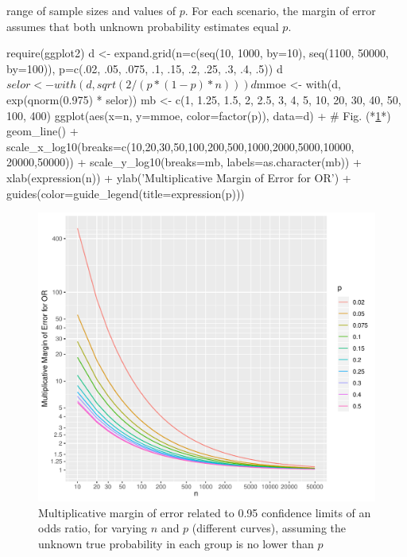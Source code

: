   range of sample sizes and values of $p$.  For each scenario, the
  margin of error assumes that both unknown probability estimates equal $p$.
\ei
\begin{Schunk}
\begin{Sinput}
require(ggplot2)
d <- expand.grid(n=c(seq(10, 1000, by=10), seq(1100, 50000, by=100)),
                 p=c(.02, .05, .075, .1, .15, .2, .25, .3, .4, .5))
d$selor <- with(d, sqrt(2 / (p * (1 - p) * n)))
d$mmoe  <- with(d, exp(qnorm(0.975) * selor))
mb <- c(1, 1.25, 1.5, 2, 2.5, 3, 4, 5, 10, 20, 30, 40, 50, 100, 400)
ggplot(aes(x=n, y=mmoe, color=factor(p)), data=d) +   # Fig. (*\ref{fig:prop-mmeor}*)
  geom_line() +
  scale_x_log10(breaks=c(10,20,30,50,100,200,500,1000,2000,5000,10000,
                  20000,50000)) +
  scale_y_log10(breaks=mb, labels=as.character(mb)) +
  xlab(expression(n)) + ylab('Multiplicative Margin of Error for OR') +
  guides(color=guide_legend(title=expression(p)))
\end{Sinput}
\begin{figure}[htbp]

\centerline{\includegraphics[width=\maxwidth]{prop-mmeor-1} }

\caption[Multiplicative margin of error for odds ratios]{Multiplicative margin of error related to 0.95 confidence limits of an odds ratio, for varying $n$ and $p$ (different curves), assuming the unknown true probability in each group is no lower than $p$}\label{fig:prop-mmeor}
\end{figure}
\end{Schunk}


